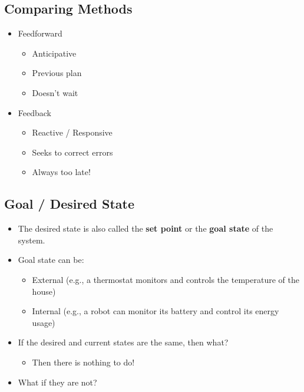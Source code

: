 \documentclass[10pt]{article}
\begin{document}
\subsection*{Comparing Methods}
\begin{itemize}
	\item Feedforward
	\begin{itemize}
        \item Anticipative
        \item Previous plan
        \item Doesn't wait
    \end{itemize}
	\item Feedback
	\begin{itemize}
        \item Reactive / Responsive
        \item Seeks to correct errors
        \item Always too late!
    \end{itemize}
\end{itemize}

\subsection*{Goal / Desired State}
\begin{itemize}
	\item The desired state is also called the \textbf{set point} or the \textbf{goal state} of the system.
	\item Goal state can be:
	\begin{itemize}
        \item External (e.g., a thermostat monitors and controls the temperature of the house)
        \item Internal (e.g., a robot can monitor its battery and control its energy usage)
    \end{itemize}
    \item If the desired and current states are the same, then what?
    \begin{itemize}
        \item Then there is nothing to do!
    \end{itemize}
    \item What if they are not?
\end{itemize}
\end{document}
